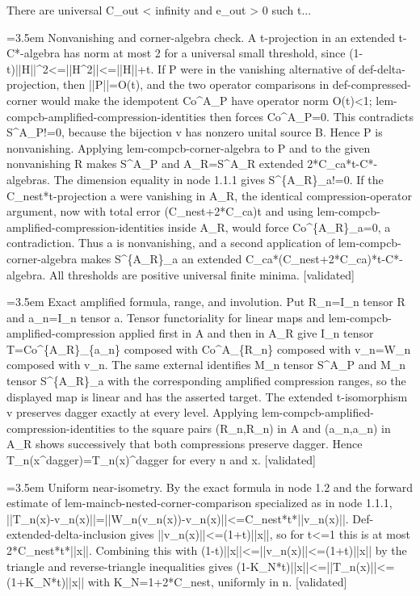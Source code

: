 \documentclass{article}
\newcommand{\step}[1]{\par\noindent\hangindent=3.5em\hangafter=1%
  \makebox[3.5em][l]{\textbf{#1.}}}
\newcommand{\steptag}[1]{\hfill{\small\textsf{[#1]}}}
\begin{document}
\begin{proofbox}{There are universal C\_out < infinity and e\_out > 0 such t...}
\step{1.1.2} Nonvanishing and corner-algebra check. A t-projection in an extended t-C*-algebra has norm at most 2 for a universal small threshold, since (1-t)||H||\textasciicircum{}2<=||H\textasciicircum{}2||<=||H||+t. If P were in the vanishing alternative of def-delta-projection, then ||P||=O(t), and the two operator comparisons in def-compressed-corner would make the idempotent Co\textasciicircum{}A\_P have operator norm O(t)<1; lem-compcb-amplified-compression-identities then forces Co\textasciicircum{}A\_P=0. This contradicts S\textasciicircum{}A\_P!=0, because the bijection v has nonzero unital source B. Hence P is nonvanishing. Applying lem-compcb-corner-algebra to P and to the given nonvanishing R makes S\textasciicircum{}A\_P and A\_R=S\textasciicircum{}A\_R extended 2*C\_ca*t-C*-algebras. The dimension equality in node 1.1.1 gives S\textasciicircum{}\{A\_R\}\_a!=0. If the C\_nest*t-projection a were vanishing in A\_R, the identical compression-operator argument, now with total error (C\_nest+2*C\_ca)t and using lem-compcb-amplified-compression-identities inside A\_R, would force Co\textasciicircum{}\{A\_R\}\_a=0, a contradiction. Thus a is nonvanishing, and a second application of lem-compcb-corner-algebra makes S\textasciicircum{}\{A\_R\}\_a an extended C\_ca*(C\_nest+2*C\_ca)*t-C*-algebra. All thresholds are positive universal finite minima. \steptag{validated} \\[4pt]
\step{1.2} Exact amplified formula, range, and involution. Put R\_n=I\_n tensor R and a\_n=I\_n tensor a. Tensor functoriality for linear maps and lem-compcb-amplified-compression applied first in A and then in A\_R give I\_n tensor T=Co\textasciicircum{}\{A\_R\}\_\{a\_n\} composed with Co\textasciicircum{}A\_\{R\_n\} composed with v\_n=W\_n composed with v\_n. The same external identifies M\_n tensor S\textasciicircum{}A\_P and M\_n tensor S\textasciicircum{}\{A\_R\}\_a with the corresponding amplified compression ranges, so the displayed map is linear and has the asserted target. The extended t-isomorphism v preserves dagger exactly at every level. Applying lem-compcb-amplified-compression-identities to the square pairs (R\_n,R\_n) in A and (a\_n,a\_n) in A\_R shows successively that both compressions preserve dagger. Hence T\_n(x\textasciicircum{}dagger)=T\_n(x)\textasciicircum{}dagger for every n and x. \steptag{validated} \\[4pt]
\step{1.3} Uniform near-isometry. By the exact formula in node 1.2 and the forward estimate of lem-maincb-nested-corner-comparison specialized as in node 1.1.1, ||T\_n(x)-v\_n(x)||=||W\_n(v\_n(x))-v\_n(x)||<=C\_nest*t*||v\_n(x)||. Def-extended-delta-inclusion gives ||v\_n(x)||<=(1+t)||x||, so for t<=1 this is at most 2*C\_nest*t*||x||. Combining this with (1-t)||x||<=||v\_n(x)||<=(1+t)||x|| by the triangle and reverse-triangle inequalities gives (1-K\_N*t)||x||<=||T\_n(x)||<=(1+K\_N*t)||x|| with K\_N=1+2*C\_nest, uniformly in n. \steptag{validated} \\[4pt]

\end{proofbox}
\end{document}
